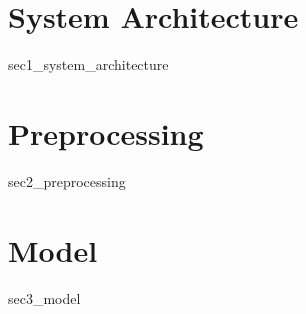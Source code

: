 \section{System Architecture}
{sec1_system_architecture}

\section{Preprocessing}
{sec2_preprocessing}

\section{Model}
{sec3_model}